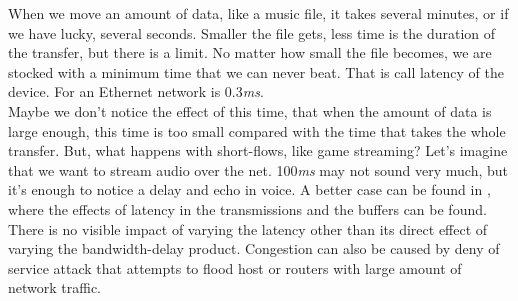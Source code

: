 When we move an amount of data, like a music file, it takes several minutes, or if we have lucky, several seconds. Smaller the file gets, less time is the duration of the transfer, but there is a limit. No matter how small the file becomes, we are stocked with a minimum time that we can never beat. That is call latency of the device. For an Ethernet network is 0.3\textit{ms}.\\

Maybe we don't notice the effect of this time, that when the amount of data is large enough, this time is too small compared with the time that takes the whole transfer. But, what happens with short-flows, like game streaming? Let's imagine that we want to stream audio over the net. 100\textit{ms} may not sound very much, but it's enough to notice a delay and echo in voice. A better case can be found in \cite{main:ref:3}, where the effects of latency in the transmissions and the buffers can be found.\\

There is no visible impact of varying the latency other than its direct effect of varying the bandwidth-delay product. Congestion can also be caused by deny of service attack that attempts to flood host or routers with large amount of network traffic. \\

